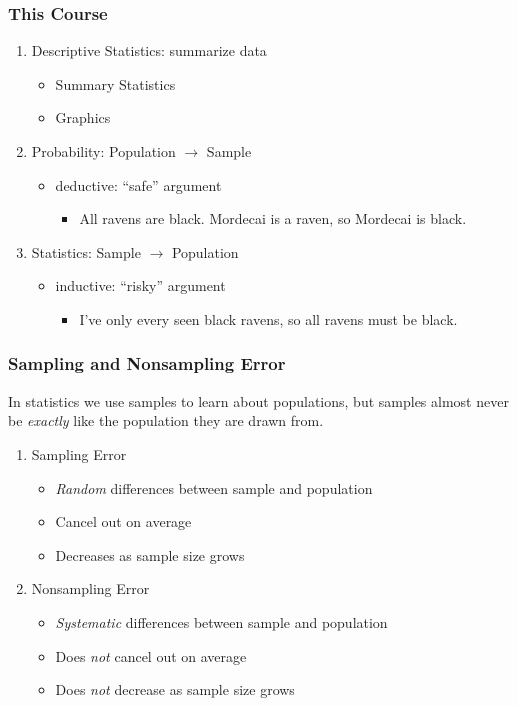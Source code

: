 \documentclass{beamer}
\begin{document}
\begin{frame}

\frametitle{This Course}

\begin{enumerate}
	\item Descriptive Statistics: summarize data
		\begin{itemize}
			\item Summary Statistics
			\item Graphics
		\end{itemize}
	\item Probability: Population $\rightarrow$ Sample
		\begin{itemize}
			\item deductive: ``safe'' argument
				\begin{itemize}
					\item All ravens are black. Mordecai is a raven, so Mordecai is black.
				\end{itemize}
		\end{itemize}
	\item Statistics: Sample $\rightarrow$ Population
		\begin{itemize}
			\item inductive: ``risky'' argument
				\begin{itemize}
					\item I've only every seen black ravens, so all ravens must be black.
				\end{itemize}
		 \end{itemize}
\end{enumerate}


\end{frame}
\begin{frame}
\frametitle{Sampling and Nonsampling Error}
In statistics we use samples to learn about populations, but samples almost never be \emph{exactly} like the population they are drawn from.
	\begin{enumerate}
		\item Sampling Error 
			\begin{itemize}
				\item \emph{Random} differences between sample and population
				\item Cancel out on average
				\item Decreases as sample size grows
			\end{itemize}
		\item Nonsampling Error
			\begin{itemize}
				\item \emph{Systematic} differences between sample and population 
				\item Does \emph{not} cancel out on average
				\item Does \emph{not} decrease as sample size grows
			\end{itemize}
	\end{enumerate}
\end{frame}
\end{document}
